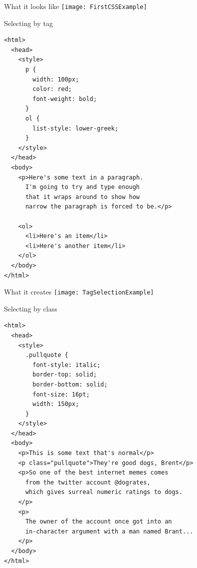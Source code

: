 \documentclass[notes]{beamer}
\begin{document}
\begin{frame}{What it looks like}
  \texttt{[image: FirstCSSExample]}
\end{frame}

\begin{frame}[fragile]{Selecting by tag}
  \begin{verbatim}
<html>
  <head>
    <style>
      p {
        width: 100px;
        color: red;
        font-weight: bold;
      }
      ol {
        list-style: lower-greek;
      }
    </style>
  </head>
  <body>
    <p>Here's some text in a paragraph.
      I'm going to try and type enough
      that it wraps around to show how
      narrow the paragraph is forced to be.</p>

    <ol>
      <li>Here's an item</li>
      <li>Here's another item</li>
    </ol>
  </body>
</html>
  \end{verbatim}
\end{frame}

\begin{frame}{What it creates}
  \texttt{[image: TagSelectionExample]}
\end{frame}

\begin{frame}[fragile]{Selecting by class}
  \begin{verbatim}
<html>
  <head>
    <style>
      .pullquote {
        font-style: italic;
        border-top: solid;
        border-bottom: solid;
        font-size: 16pt;
        width: 150px;
      }
    </style>
  </head>
  <body>
    <p>This is some text that's normal</p>
    <p class="pullquote">They're good dogs, Brent</p>
    <p>So one of the best internet memes comes
      from the twitter account @dogrates,
      which gives surreal numeric ratings to dogs.
    </p>
    <p>
      The owner of the account once got into an
      in-character argument with a man named Brant...
    </p>
  </body>
</html>    
\end{verbatim}

\end{frame}
\end{document}
